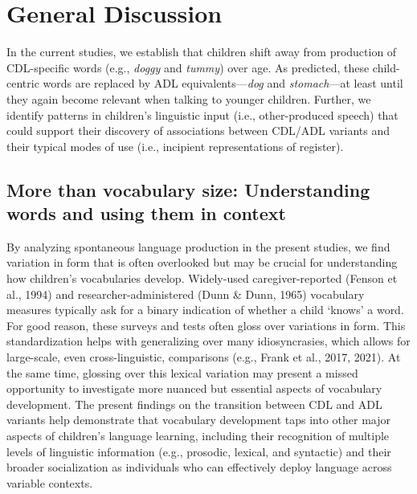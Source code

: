 \documentclass[10pt, letterpaper]{article}
\begin{document}
\hypertarget{general-discussion}{%
\section{General Discussion}\label{general-discussion}}

In the current studies, we establish that children shift away from
production of CDL-specific words (e.g., \emph{doggy} and \emph{tummy})
over age. As predicted, these child-centric words are replaced by ADL
equivalents---\emph{dog} and \emph{stomach}---at least until they again
become relevant when talking to younger children. Further, we identify
patterns in children's linguistic input (i.e., other-produced speech)
that could support their discovery of associations between CDL/ADL
variants and their typical modes of use (i.e., incipient representations
of register).

\hypertarget{more-than-vocabulary-size-understanding-words-and-using-them-in-context}{%
\subsection{More than vocabulary size: Understanding words and using
them in
context}\label{more-than-vocabulary-size-understanding-words-and-using-them-in-context}}

By analyzing spontaneous language production in the present studies, we
find variation in form that is often overlooked but may be crucial for
understanding how children's vocabularies develop. Widely-used
caregiver-reported (Fenson et al., 1994) and researcher-administered
(Dunn \& Dunn, 1965) vocabulary measures typically ask for a binary
indication of whether a child `knows' a word. For good reason, these
surveys and tests often gloss over variations in form. This
standardization helps with generalizing over many idiosyncrasies, which
allows for large-scale, even cross-linguistic, comparisons (e.g., Frank
et al., 2017, 2021). At the same time, glossing over this lexical
variation may present a missed opportunity to investigate more nuanced
but essential aspects of vocabulary development. The present findings on
the transition between CDL and ADL variants help demonstrate that
vocabulary development taps into other major aspects of children's
language learning, including their recognition of multiple levels of
linguistic information (e.g., prosodic, lexical, and syntactic) and
their broader socialization as individuals who can effectively deploy
language across variable contexts.
\end{document}
